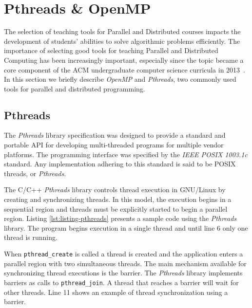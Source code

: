 \section{Pthreads \& OpenMP}
\label{sec:apis}

The selection of teaching tools for Parallel and Distributed courses impacts
the development of students' abilities to solve algorithmic problems
efficiently. The importance of selecting good tools for teaching Parallel and
Distributed Computing has been increasingly important, especially since the
topic became a core component of the ACM undergraduate computer science
curricula in 2013~\cite{acmcurricula}.  In this section we briefly describe
\textit{OpenMP} and \textit{Pthreads}, two commonly used tools for parallel and
distributed programming.

\subsection{Pthreads}

The \textit{Pthreads} library specification was designed to provide a standard
and portable API for developing multi-threaded programs for multiple vendor
platforms.  The programming interface was specified by the \textit{IEEE POSIX
1003.1c} standard. Any implementation adhering to this standard is said to be
POSIX threads, or \textit{Pthreads}.

The C/C++ \textit{Pthreads} library controls thread execution in GNU/Linux by
creating and synchronizing threads. In this model, the execution begins in a
sequential region and threads must be explicitly started to begin
a parallel region.
Listing \ref{lst:listing-pthreads} presents a sample code using the
\textit{Pthreads} library. The program begins execution in a
single thread and until line 6 only one thread is running.

When \texttt{pthread\_create} is called a thread is created and the application
enters a parallel region with two simultaneous threads.  The main mechanism
available for synchronizing thread executions is the barrier. The
\textit{Pthreads} library implements barriers as calls to
\texttt{pthread\_join}. A thread that reaches a barrier will wait for other
threads. Line 11 shows an example of thread synchronization using a barrier.


